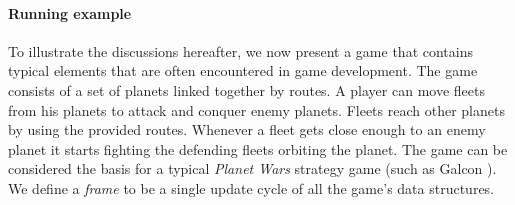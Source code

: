 \begin{comment}
General purpose \textbf{languages} (GPL) are suitable for any kind of computational task, including the development of games. This is due to the high expressive power deriving from the the availability of different GPLs for different kinds of abstractions. Every abstraction is built around specific problems, which introduces levels of difficulty in using such abstractions. C\#, Python, and Objective-C are typical examples \cite{languages_for_games1} of languages used for game development. A typical limitation in using GPLs is in expressing performance patterns, since the languages' focus is on the expressiveness. Optimizations that are significant in particular contexts (e.g., the context of game development) are not well expressed by GPLs (with the exception of SQL \cite{sql_indices} indexes). Complex code may require highly complex optimizations, depending on the context. Since such optimizations cannot be supported by a GPL, developers must implement them by hand. In game development, where optimizations of performance are a necessity, they increase the costs of development considerably. Unless the developers have access to large financial resources, the use of a GPL for game development is not a good choice, unless the game remains very small or does not need high performance. Some languages have been developed taking this into account for specific kinds of games. For instance, with CDML \cite{callahan2004cascade} developers are supposed to design their game around the producer-consumer design pattern in order to get the best support from the compilation process. With Inform, Ren'Py and Zillions of Games \cite{languages_for_games2} developers are limited to developing games within particular genres, such as storytelling or board games.
\end{comment}

\paragraph*{Running example}


To illustrate the discussions hereafter, we now present a game that contains typical elements that are often encountered in game development. The game consists of a set of planets linked together by routes. A player can move fleets from his planets to attack and conquer enemy planets. Fleets reach other planets by using the provided routes. Whenever a fleet gets close enough to an enemy planet it starts fighting the defending fleets orbiting the planet. The game can be considered the basis for a typical \emph{Planet Wars} strategy game (such as Galcon \cite{wiki:galcon}). We define a \textit{frame} to be a single update cycle of all the game's data structures.

